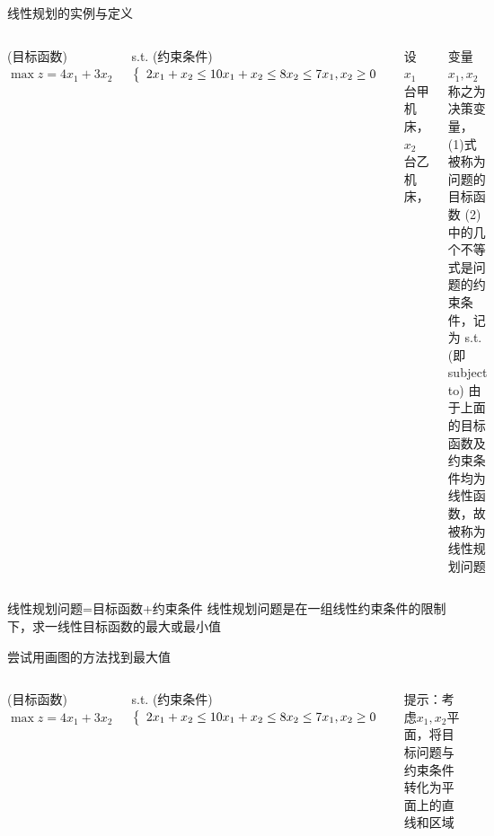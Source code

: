\documentclass[xcolor=table,dvipsnames,svgnames,aspectratio=169,fontset=ubuntu]{ctexbeamer}
\let\\\relax
\begin{document}
\begin{frame}{线性规划的实例与定义}
  \begin{columns}

    (目标函数) $\max z=4 x_1+3 x_2$

    \vskip 15pt
    s.t. (约束条件) $\left\{\begin{array}{l}2 x_1+x_2 \leq 10 \\ x_1+x_2 \leq 8 \\ x_2 \leq 7 \\ x_1, x_2 \geq 0\end{array}\right.$

    设 $x_1$ 台甲机床， $x_2$ 台乙机床，

    变量 $x_1,x_2$ 称之为决策变量，
    \vskip 5pt
    (1)式被称为问题的目标函数
    \vskip 5pt
    (2)中的几个不等式是问题的约束条件，记为 s.t.(即 subject to)
    \vskip 5pt
    由于上面的目标函数及约束条件均为线性函数，故被称为线性规划问题
\end{columns}

\vskip 20pt
\begin{alertblock}{线性规划问题=目标函数+约束条件}
线性规划问题是在一组线性约束条件的限制下，求一线性目标函数的最大或最小值
\end{alertblock}
\end{frame}

\begin{frame}{尝试用画图的方法找到最大值}
  \begin{columns}

    (目标函数) $\max z=4 x_1+3 x_2$

    \vskip 15pt
    s.t. (约束条件) $\left\{\begin{array}{l}2 x_1+x_2 \leq 10 \\ x_1+x_2 \leq 8 \\ x_2 \leq 7 \\ x_1, x_2 \geq 0\end{array}\right.$

    提示：考虑$x_1,x_2$平面，将目标问题与约束条件转化为平面上的直线和区域
  \end{columns}
\end{frame}
\end{document}
